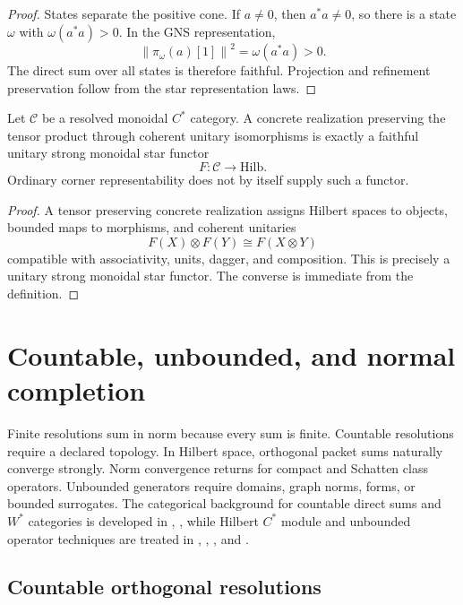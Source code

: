 \documentclass{aomart}
\theoremstyle{definition}
\theoremstyle{remark}
\newcommand{\Ccal}{\mathcal C}
\newcommand{\norm}[1]{\left\lVert#1\right\rVert}
\newcommand{\Rcite}[1]{\cite{#1}}
\begin{document}
\begin{proof}
States separate the positive cone. If \(a\ne0\), then \(a^*a\ne0\), so there is a state \(\omega\) with \(\omega(a^*a)>0\). In the GNS representation,
\[
 \norm{\pi_\omega(a)[1]}^2
 =
 \omega(a^*a)>0.
\]
The direct sum over all states is therefore faithful. Projection and refinement preservation follow from the star representation laws.
\end{proof}

\begin{proposition}\label{prop:monoidal_boundary}
Let \(\Ccal\) be a resolved monoidal \(C^*\) category. A concrete realization preserving the tensor product through coherent unitary isomorphisms is exactly a faithful unitary strong monoidal star functor
\[
 F:\Ccal\longrightarrow\mathrm{Hilb}.
\]
Ordinary corner representability does not by itself supply such a functor.
\end{proposition}

\begin{proof}
A tensor preserving concrete realization assigns Hilbert spaces to objects, bounded maps to morphisms, and coherent unitaries
\[
 F(X)\otimes F(Y)\cong F(X\otimes Y)
\]
compatible with associativity, units, dagger, and composition. This is precisely a unitary strong monoidal star functor. The converse is immediate from the definition.
\end{proof}

\section{Countable, unbounded, and normal completion}\label{sec:countable}

Finite resolutions sum in norm because every sum is finite. Countable resolutions require a declared topology. In Hilbert space, orthogonal packet sums naturally converge strongly. Norm convergence returns for compact and Schatten class operators. Unbounded generators require domains, graph norms, forms, or bounded surrogates. The categorical background for countable direct sums and \(W^*\) categories is developed in \Rcite{R2}, \Rcite{R5}, while Hilbert \(C^*\) module and unbounded operator techniques are treated in \Rcite{R6}, \Rcite{R7}, \Rcite{R10}, and \Rcite{R20}.

\subsection{Countable orthogonal resolutions}
\end{document}

